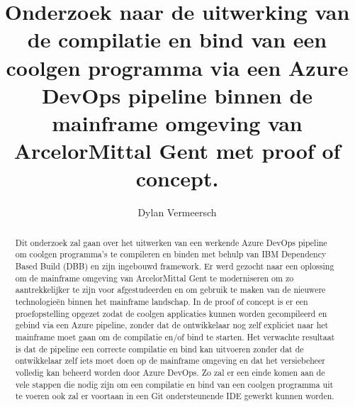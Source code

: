 \documentclass{hogent-article}
\title{Onderzoek naar de uitwerking van de compilatie en bind van een coolgen programma via een Azure DevOps pipeline binnen de mainframe omgeving van ArcelorMittal Gent met proof of concept.}
\author{Dylan Vermeersch}
\begin{document}
\begin{abstract}
  Dit onderzoek zal gaan over het uitwerken van een werkende Azure DevOps pipeline om coolgen programma's te compileren en binden met behulp van IBM Dependency Based Build (DBB) en zijn ingebouwd framework. Er werd gezocht naar een oplossing om de mainframe omgeving van ArcelorMittal Gent te moderniseren om zo aantrekkelijker te zijn voor afgestudeerden en om gebruik te maken van de nieuwere technologieën binnen het mainframe landschap. In de proof of concept is er een proefopstelling opgezet zodat de coolgen applicaties kunnen worden gecompileerd en gebind via een Azure pipeline, zonder dat de ontwikkelaar nog zelf expliciet naar het mainframe moet gaan om de compilatie en/of bind te starten. Het verwachte resultaat is dat de pipeline een correcte compilatie en bind kan uitvoeren zonder dat de ontwikkelaar zelf iets moet doen op de mainframe omgeving en dat het versiebeheer volledig kan beheerd worden door Azure DevOps. Zo zal er een einde komen aan de vele stappen die nodig zijn om een compilatie en bind van een coolgen programma uit te voeren ook zal er voortaan in een Git ondersteunende IDE gewerkt kunnen worden.
\end{abstract}

\tableofcontents



\printbibliography[heading=bibintoc]
\end{document}
